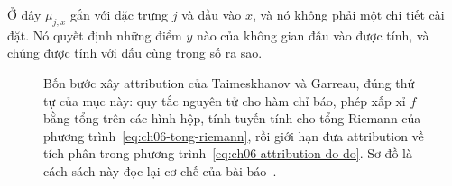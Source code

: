 Ở đây $\mu_{j,x}$ gắn với đặc trưng $j$ và đầu vào $x$, và nó không phải một
chi tiết cài đặt. Nó quyết định những điểm $y$ nào của không gian đầu vào được
tính, và chúng được tính với dấu cùng trọng số ra sao.

\begin{figure}[htbp]
  \centering
  
  \caption{Bốn bước xây attribution của Taimeskhanov và Garreau, đúng thứ tự
  của mục này: quy tắc nguyên tử cho hàm chỉ báo, phép xấp xỉ $f$ bằng tổng
  trên các hình hộp, tính tuyến tính cho tổng Riemann của
  phương trình~\ref{eq:ch06-tong-riemann}, rồi giới hạn đưa attribution về
  tích phân trong phương trình~\ref{eq:ch06-attribution-do-do}. Sơ đồ là cách
  sách này đọc lại cơ chế của bài báo~\autocite{p17firstprinciples}.}
  \label{fig:ch06-xay-attribution}
\end{figure}
